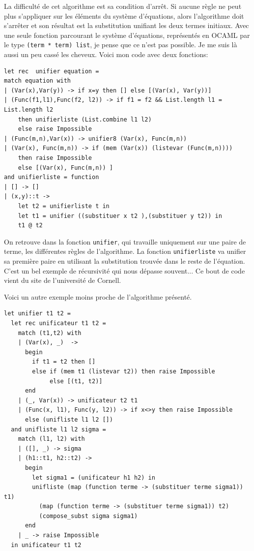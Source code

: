 \documentclass[11pt]{book}
\begin{document}
La difficulté de cet algorithme est  sa condition d'arrêt. 
 Si aucune règle ne peut plus s'appliquer sur les éléments du système d'équations, alors l'algorithme doit s'arrêter et son résultat est
la substitution unifiant les deux termes initiaux.
Avec une seule fonction parcourant le système d'équations, représentés en OCAML par le type \verb+(term * term) list+,
je pense que ce n'est pas possible. Je me suis là aussi un peu cassé les cheveux.
Voici mon code avec deux fonctions:
\begin{Verbatim}
let rec  unifier equation =
match equation with
| (Var(x),Var(y)) -> if x=y then [] else [(Var(x), Var(y))] 
| (Func(f1,l1),Func(f2, l2)) -> if f1 = f2 && List.length l1 = List.length l2 
	then unifierliste (List.combine l1 l2)
	else raise Impossible
| (Func(m,n),Var(x)) -> unifier8 (Var(x), Func(m,n)) 
| (Var(x), Func(m,n)) -> if (mem (Var(x)) (listevar (Func(m,n)))) 
	then raise Impossible
	else [(Var(x), Func(m,n)) ] 
and unifierliste = function
| [] -> []
| (x,y)::t ->
	let t2 = unifierliste t in
	let t1 = unifier ((substituer x t2 ),(substituer y t2)) in
	t1 @ t2
\end{Verbatim}
On retrouve dans la fonction \verb+unifier+, qui travaille uniquement sur une paire de terme, les différentes règles
de l'algorithme. La fonction \verb+unifierliste+ va unifier sa première paire en utilisant la substitution trouvée dans le reste
de l'équation. C'est un bel exemple de récursivité qui nous dépasse souvent... 
Ce bout de code vient du site de l'université de Cornell.

Voici un autre exemple moins proche de l'algorithme présenté.
\begin{Verbatim}
let unifier t1 t2 =
  let rec unificateur t1 t2 =
    match (t1,t2) with
    | (Var(x), _)  -> 
      begin
        if t1 = t2 then [] 
        else if (mem t1 (listevar t2)) then raise Impossible
             else [(t1, t2)]
      end		  
    | (_, Var(x)) -> unificateur t2 t1
    | (Func(x, l1), Func(y, l2)) -> if x<>y then raise Impossible
      else (unifliste l1 l2 [])
  and unifliste l1 l2 sigma =
    match (l1, l2) with
    | ([], _) -> sigma
    | (h1::t1, h2::t2) ->
      begin
        let sigma1 = (unificateur h1 h2) in
        unifliste (map (function terme -> (substituer terme sigma1)) t1)
          (map (function terme -> (substituer terme sigma1)) t2)
          (compose_subst sigma sigma1)
      end		
    | _ -> raise Impossible
  in unificateur t1 t2 
\end{Verbatim}
\end{document}
